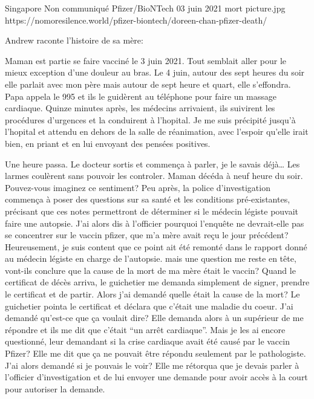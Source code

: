           {Singapore}
          {Non communiqué}
          {Pfizer/BioNTech}
          {03 juin 2021}
          {mort}
          {picture.jpg}
          {https://nomoresilence.world/pfizer-biontech/doreen-chan-pfizer-death/}
          {
Andrew raconte l'histoire de sa mère:

Maman est partie se faire vacciné le 3 juin 2021. Tout semblait aller pour le
mieux exception d'une douleur au bras. Le 4 juin, autour des sept heures du soir
elle parlait avec mon père mais autour de sept heure et quart, elle
s'effondra. Papa appela le 995 et ils le guidèrent au téléphone pour faire un
massage cardiaque. Quinze minutes après, les médecins arrivaient, ils suivirent
les procédures d'urgences et la conduirent à l'hopital. Je me suis précipité
jusqu'à l'hopital et attendu en dehors de la salle de réanimation, avec l'espoir
qu'elle irait bien, en priant et en lui envoyant des pensées positives.

Une heure passa. Le docteur sortis et commença à parler, je le savais déjà… Les
larmes coulèrent sans pouvoir les controler. Maman décéda à neuf heure du
soir. Pouvez-vous imaginez ce sentiment? Peu après, la police d'investigation
commença à poser des questions sur sa santé et les conditions pré-existantes,
précisant que ces notes permettront de déterminer si le médecin légiste pouvait
faire une autopsie. J'ai alors dis à l'officier pourquoi l'enquête ne
devrait-elle pas se concentrer sur le vaccin pfizer, que m'a mère avait reçu le
jour précédent? Heureusement, je suis content que ce point ait été remonté dans
le rapport donné au médecin légiste en charge de l'autopsie. mais une question
me reste en tête, vont-ils conclure que la cause de la mort de ma mère était le
vaccin? Quand le certificat de décès arriva, le guichetier me demanda simplement
de signer, prendre le certificat et de partir. Alors j'ai demandé quelle était
la cause de la mort? Le guichetier pointa le certificat et déclara que c'était
une maladie du coeur. J'ai demandé qu'est-ce que ça voulait dire? Elle demanda
alors à un supérieur de me répondre et ils me dit que c'était “un arrêt
cardiaque”. Mais je les ai encore questionné, leur demandant si la crise
cardiaque avait été causé par le vaccin Pfizer? Elle me dit que ça ne pouvait
être répondu seulement par le pathologiste. J'ai alors demandé si je pouvais le
voir? Elle me rétorqua que je devais parler à l'officier d'investigation et de
lui envoyer une demande pour avoir accès à la court pour autoriser la demande.

}
